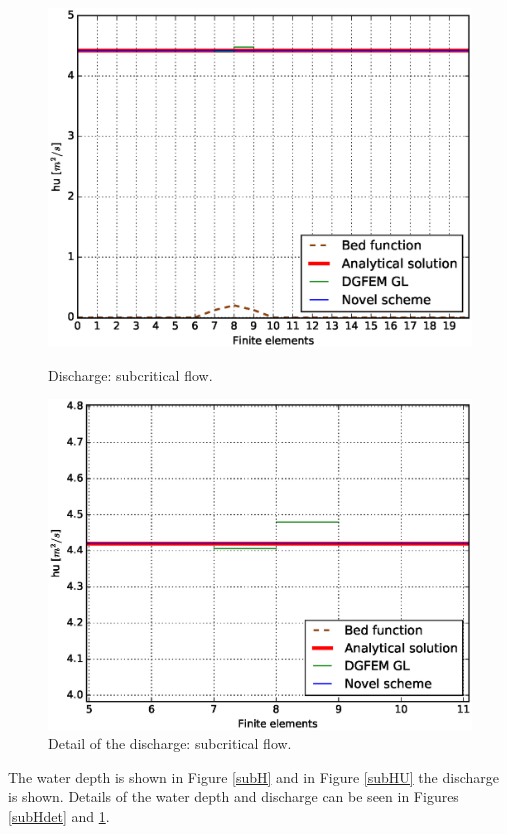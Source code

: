				\begin{figure}[!ht]
								\centering
								 \begin{minipage}[t]{0.44\textwidth}
								    \begin{center}
								    \includegraphics[width=1.0\textwidth]{OBR/bump/subHU.eps}
								    \caption{Discharge: subcritical flow.}
								    \label{subHU}
								    \end{center}
								\end{minipage}\hspace{15mm}
								\begin{minipage}[t]{0.44\textwidth}
								    \begin{center}
								    \includegraphics[width=1.0\textwidth]{OBR/bump/subHUdet.eps}
								    \caption{Detail of the discharge: subcritical flow.}
								    \label{subHUdet}
								    \end{center}
								\end{minipage}
				\end{figure}
The water depth is shown in Figure \ref{subH} and in Figure \ref{subHU} the discharge is shown. Details of the water depth and discharge can be seen in Figures \ref{subHdet} and \ref{subHUdet}. 

